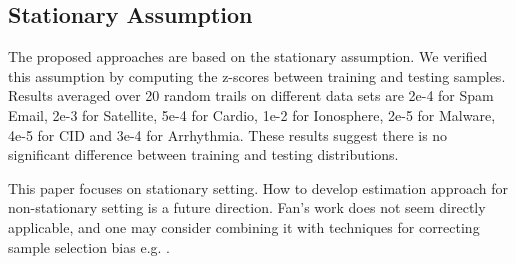 \documentclass[10pt,a4paper,conference]{IEEEtran}
\begin{document}






\subsection{Stationary Assumption} 

The proposed approaches are based on the 
stationary assumption. We verified this 
assumption by computing the z-scores between 
training and testing samples. Results averaged 
over 20 random trails on different data sets 
are 2e-4 for Spam Email, 2e-3 for Satellite, 
5e-4 for Cardio, 1e-2 for Ionosphere, 2e-5 for Malware, 
4e-5 for CID and 3e-4 for Arrhythmia. These results 
suggest there is no significant difference between 
training and testing distributions. 

This paper focuses on stationary setting. 
How to develop estimation approach 
for non-stationary setting is a future direction. 
Fan's work does not seem directly applicable, 
and one may consider combining it with techniques 
for correcting sample selection bias e.g. 
\cite{huang2007correcting}.


\end{document}
